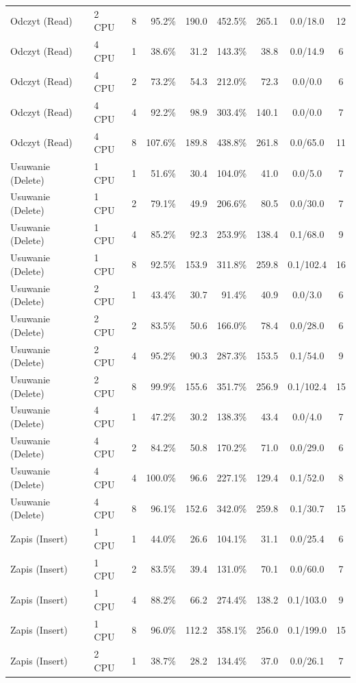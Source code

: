 \begin{table}[ht]
{\begin{tabular}{llcrrrrcc}
Odczyt (Read) & 2 CPU & 8 & 95.2\% & 190.0 & 452.5\% & 265.1 & 0.0/18.0 & 12 \\
Odczyt (Read) & 4 CPU & 1 & 38.6\% & 31.2 & 143.3\% & 38.8 & 0.0/14.9 & 6 \\
Odczyt (Read) & 4 CPU & 2 & 73.2\% & 54.3 & 212.0\% & 72.3 & 0.0/0.0 & 6 \\
Odczyt (Read) & 4 CPU & 4 & 92.2\% & 98.9 & 303.4\% & 140.1 & 0.0/0.0 & 7 \\
Odczyt (Read) & 4 CPU & 8 & 107.6\% & 189.8 & 438.8\% & 261.8 & 0.0/65.0 & 11 \\
Usuwanie (Delete) & 1 CPU & 1 & 51.6\% & 30.4 & 104.0\% & 41.0 & 0.0/5.0 & 7 \\
Usuwanie (Delete) & 1 CPU & 2 & 79.1\% & 49.9 & 206.6\% & 80.5 & 0.0/30.0 & 7 \\
Usuwanie (Delete) & 1 CPU & 4 & 85.2\% & 92.3 & 253.9\% & 138.4 & 0.1/68.0 & 9 \\
Usuwanie (Delete) & 1 CPU & 8 & 92.5\% & 153.9 & 311.8\% & 259.8 & 0.1/102.4 & 16 \\
Usuwanie (Delete) & 2 CPU & 1 & 43.4\% & 30.7 & 91.4\% & 40.9 & 0.0/3.0 & 6 \\
Usuwanie (Delete) & 2 CPU & 2 & 83.5\% & 50.6 & 166.0\% & 78.4 & 0.0/28.0 & 6 \\
Usuwanie (Delete) & 2 CPU & 4 & 95.2\% & 90.3 & 287.3\% & 153.5 & 0.1/54.0 & 9 \\
Usuwanie (Delete) & 2 CPU & 8 & 99.9\% & 155.6 & 351.7\% & 256.9 & 0.1/102.4 & 15 \\
Usuwanie (Delete) & 4 CPU & 1 & 47.2\% & 30.2 & 138.3\% & 43.4 & 0.0/4.0 & 7 \\
Usuwanie (Delete) & 4 CPU & 2 & 84.2\% & 50.8 & 170.2\% & 71.0 & 0.0/29.0 & 6 \\
Usuwanie (Delete) & 4 CPU & 4 & 100.0\% & 96.6 & 227.1\% & 129.4 & 0.1/52.0 & 8 \\
Usuwanie (Delete) & 4 CPU & 8 & 96.1\% & 152.6 & 342.0\% & 259.8 & 0.1/30.7 & 15 \\
Zapis (Insert) & 1 CPU & 1 & 44.0\% & 26.6 & 104.1\% & 31.1 & 0.0/25.4 & 6 \\
Zapis (Insert) & 1 CPU & 2 & 83.5\% & 39.4 & 131.0\% & 70.1 & 0.0/60.0 & 7 \\
Zapis (Insert) & 1 CPU & 4 & 88.2\% & 66.2 & 274.4\% & 138.2 & 0.1/103.0 & 9 \\
Zapis (Insert) & 1 CPU & 8 & 96.0\% & 112.2 & 358.1\% & 256.0 & 0.1/199.0 & 15 \\
Zapis (Insert) & 2 CPU & 1 & 38.7\% & 28.2 & 134.4\% & 37.0 & 0.0/26.1 & 7 \\

\end{tabular}}
\end{table}
